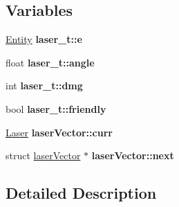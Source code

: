 \subsection*{Variables}
\begin{DoxyCompactItemize}
\item 
\mbox{\label{group__Laser_gae947ab2c964d3d265376c2d1c141556a}} 
\hyperlink{structentity__t}{Entity} {\bfseries laser\+\_\+t\+::e}
\item 
\mbox{\label{group__Laser_ga35740790bb9204ac0855fdff09d078fe}} 
float {\bfseries laser\+\_\+t\+::angle}
\item 
\mbox{\label{group__Laser_ga97cba375fb9f86d8e15166a6c84a706c}} 
int {\bfseries laser\+\_\+t\+::dmg}
\item 
\mbox{\label{group__Laser_ga72bc0f1ed0a4d512ecf117b59e9ef317}} 
bool {\bfseries laser\+\_\+t\+::friendly}
\item 
\mbox{\label{group__Laser_ga87917c74473871371aa7acff1c5abb14}} 
\hyperlink{structlaser__t}{Laser} {\bfseries laser\+Vector\+::curr}
\item 
\mbox{\label{group__Laser_ga3aa0639115d63f1d076f463b2511ad10}} 
struct \hyperlink{structlaserVector}{laser\+Vector} $\ast$ {\bfseries laser\+Vector\+::next}
\end{DoxyCompactItemize}


\subsection{Detailed Description}

